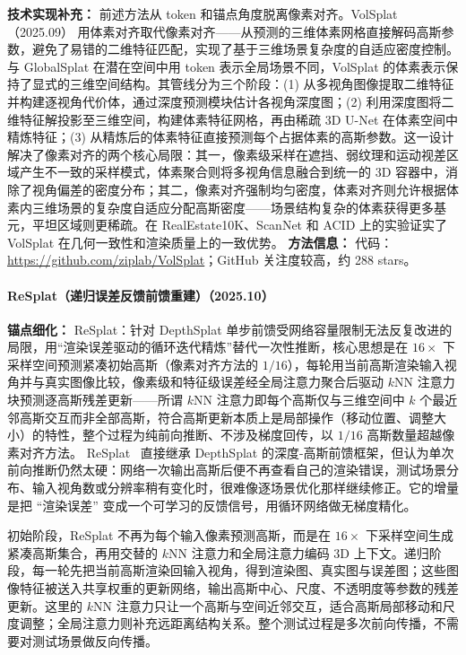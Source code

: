 \textbf{技术实现补充：} 前述方法从 token 和锚点角度脱离像素对齐。VolSplat（2025.09） 用体素对齐取代像素对齐——从预测的三维体素网格直接解码高斯参数，避免了易错的二维特征匹配，实现了基于三维场景复杂度的自适应密度控制。与 GlobalSplat 在潜在空间中用 token 表示全局场景不同，VolSplat 的体素表示保持了显式的三维空间结构。其管线分为三个阶段：(1) 从多视角图像提取二维特征并构建逐视角代价体，通过深度预测模块估计各视角深度图；(2) 利用深度图将二维特征解投影至三维空间，构建体素特征网格，再由稀疏 3D U-Net 在体素空间中精炼特征；(3) 从精炼后的体素特征直接预测每个占据体素的高斯参数。这一设计解决了像素对齐的两个核心局限：其一，像素级采样在遮挡、弱纹理和运动视差区域产生不一致的采样模式，体素聚合则将多视角信息融合到统一的 3D 容器中，消除了视角偏差的密度分布；其二，像素对齐强制均匀密度，体素对齐则允许根据体素内三维场景的复杂度自适应分配高斯密度——场景结构复杂的体素获得更多基元，平坦区域则更稀疏。在 RealEstate10K、ScanNet 和 ACID 上的实验证实了 VolSplat 在几何一致性和渲染质量上的一致优势。
\textbf{方法信息：} 代码：\url{https://github.com/ziplab/VolSplat}；GitHub 关注度较高，约 288 stars。



\paragraph{ReSplat（递归误差反馈前馈重建）（2025.10）}
\textbf{锚点细化：} ReSplat：针对 DepthSplat 单步前馈受网络容量限制无法反复改进的局限，用``渲染误差驱动的循环迭代精炼''替代一次性推断，核心思想是在 $16\times$ 下采样空间预测紧凑初始高斯（像素对齐方法的 $1/16$），每轮用当前高斯渲染输入视角并与真实图像比较，像素级和特征级误差经全局注意力聚合后驱动 $k$NN 注意力块预测逐高斯残差更新——所谓 $k$NN 注意力即每个高斯仅与三维空间中 $k$ 个最近邻高斯交互而非全部高斯，符合高斯更新本质上是局部操作（移动位置、调整大小）的特性，整个过程为纯前向推断、不涉及梯度回传，以 $1/16$ 高斯数量超越像素对齐方法。
ReSplat~\cite{2510_08575} 直接继承 DepthSplat 的深度-高斯前馈框架，但认为单次前向推断仍然太硬：网络一次输出高斯后便不再查看自己的渲染错误，测试场景分布、输入视角数或分辨率稍有变化时，很难像逐场景优化那样继续修正。它的增量是把 ``渲染误差'' 变成一个可学习的反馈信号，用循环网络做无梯度精化。

初始阶段，ReSplat 不再为每个输入像素预测高斯，而是在 $16\times$ 下采样空间生成紧凑高斯集合，再用交替的 $k$NN 注意力和全局注意力编码 3D 上下文。递归阶段，每一轮先把当前高斯渲染回输入视角，得到渲染图、真实图与误差图；这些图像特征被送入共享权重的更新网络，输出高斯中心、尺度、不透明度等参数的残差更新。这里的 $k$NN 注意力只让一个高斯与空间近邻交互，适合高斯局部移动和尺度调整；全局注意力则补充远距离结构关系。整个测试过程是多次前向传播，不需要对测试场景做反向传播。


